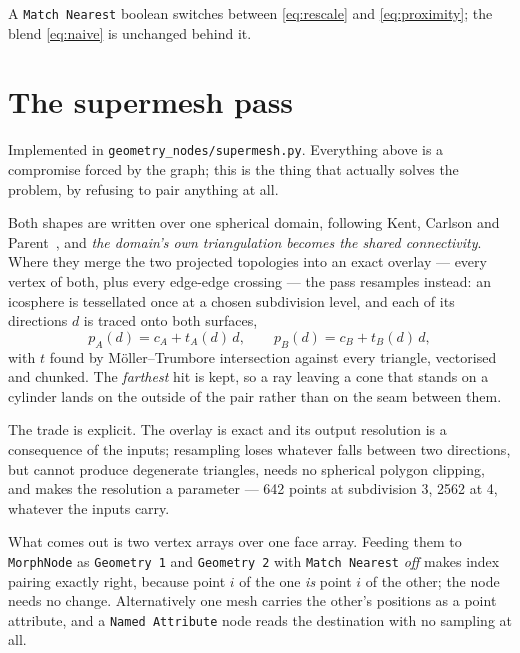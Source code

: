 \documentclass[11pt,a4paper]{article}
\newcommand{\node}[1]{\texttt{#1}}
\begin{document}
A \node{Match Nearest} boolean switches between \eqref{eq:rescale} and
\eqref{eq:proximity}; the blend \eqref{eq:naive} is unchanged behind it.

\section{The supermesh pass}\label{sec:supermesh}

Implemented in \node{geometry\_nodes/supermesh.py}. Everything above is a
compromise forced by the graph; this is the thing that actually solves the
problem, by refusing to pair anything at all.

Both shapes are written over one spherical domain, following Kent, Carlson
and Parent~\cite{kent1992}, and \emph{the domain's own triangulation becomes
the shared connectivity}. Where they merge the two projected topologies into
an exact overlay --- every vertex of both, plus every edge-edge crossing ---
the pass resamples instead: an icosphere is tessellated once at a chosen
subdivision level, and each of its directions $d$ is traced onto both
surfaces,
\begin{equation}
  p_A(d) = c_A + t_A(d)\, d ,
  \qquad
  p_B(d) = c_B + t_B(d)\, d ,
  \label{eq:trace}
\end{equation}
with $t$ found by M\"oller--Trumbore intersection against every triangle,
vectorised and chunked. The \emph{farthest} hit is kept, so a ray leaving a
cone that stands on a cylinder lands on the outside of the pair rather than
on the seam between them.

The trade is explicit. The overlay is exact and its output resolution is a
consequence of the inputs; resampling loses whatever falls between two
directions, but cannot produce degenerate triangles, needs no spherical
polygon clipping, and makes the resolution a parameter --- 642 points at
subdivision 3, 2562 at 4, whatever the inputs carry.

What comes out is two vertex arrays over one face array. Feeding them to
\node{MorphNode} as \node{Geometry 1} and \node{Geometry 2} with
\node{Match Nearest} \emph{off} makes index pairing exactly right, because
point $i$ of the one \emph{is} point $i$ of the other; the node needs no
change. Alternatively one mesh carries the other's positions as a point
attribute, and a \node{Named Attribute} node reads the destination with no
sampling at all.
\end{document}
